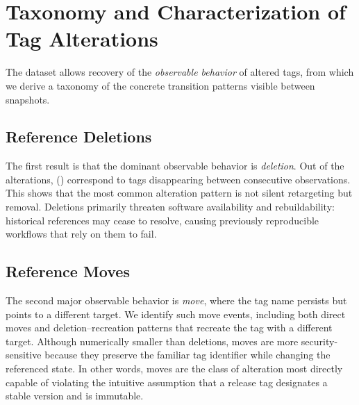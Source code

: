\section{Taxonomy and Characterization of Tag Alterations}
\label{sec:tags-taxonomy}

The dataset allows recovery of the \emph{observable behavior} of altered tags, from which we derive a taxonomy of the concrete transition patterns visible between snapshots.

\subsection{Reference Deletions}
\label{subsec:tags-deletions}

The first result is that the dominant observable behavior is \emph{deletion}.
Out of the \TotalAlterations alterations, \Deletions (\DeletionsPercent) correspond to tags disappearing between consecutive observations.
This shows that the most common alteration pattern is not silent retargeting but removal.
Deletions primarily threaten software availability and rebuildability: historical references may cease to resolve, causing previously reproducible workflows that rely on them to fail.

\subsection{Reference Moves}
\label{subsec:tags-tax-moves}

The second major observable behavior is \emph{move}, where the tag name persists but points to a different target.
We identify \LegitMoves such move events, including both direct moves and deletion--recreation patterns that recreate the tag with a different target.
Although numerically smaller than deletions, moves are more security-sensitive because they preserve the familiar tag identifier while changing the referenced state.
In other words, moves are the class of alteration most directly capable of violating the intuitive assumption that a release tag designates a stable version and is immutable.

\begin{figure}[h]
\centering
\def\svgwidth{0.55\linewidth}

\label{fig:tags-move-schematic}
\end{figure}

